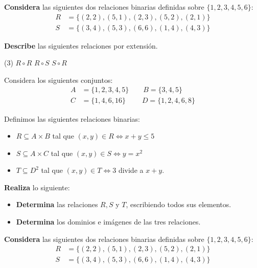 \documentclass[oneside]{style}
\begin{document}
\begin{questions}[label=\protect\circled{\bfseries\arabic*}]
    \newpage
    \question
    {
        \textbf{Considera} las siguientes dos relaciones binarias definidas 
        sobre $\{1,2,3,4,5,6\}$:
        \begin{align*}
            R &= \{(2,2), (5,1), (2,3), (5,2), (2,1)\} \\ 
            S &= \{(3,4), (5,3), (6,6), (1,4), (4,3)\}
        \end{align*}

        \textbf{Describe} las siguientes relaciones por extensión. 
        \begin{tasks}(3)
            \task $R \circ R$
            \task $R \circ S$
            \task $S \circ R$
        \end{tasks}
    }

    \question
    {
        Considera los siguientes conjuntos:
        \begin{align*}
            A &= \{1,2,3,4,5\} \quad \quad B = \{3,4,5\} \\ 
            C &= \{1,4,6,16\} \quad \quad \; D = \{1,2,4,6,8\}
        \end{align*}

        Definimos las siguientes relaciones binarias:
        \begin{itemize}
            \item $R \subseteq A \times B$ tal que $(x,y) \in R 
            \Leftrightarrow x+y \leq 5$

            \item $S \subseteq A \times C$ tal que $(x,y) \in S 
            \Leftrightarrow y = x^2$

            \item $T \subseteq D^2$ tal que $(x,y) \in T \Leftrightarrow
            3$ divide a $x+y$. 
        \end{itemize}

        \textbf{Realiza} lo siguiente:
        \begin{itemize}
            \item \textbf{Determina} las relaciones $R,S$ y $T$, escribiendo 
            todos sus elementos. 

            \item \textbf{Determina} los dominios e imágenes de las tres 
            relaciones. 
        \end{itemize}
    }

    \question
    {
        \textbf{Considera} las siguientes dos relaciones binarias definidas 
        sobre $\{1,2,3,4,5,6\}$:
        \begin{align*}
            R &= \{(2,2), (5,1), (2,3), (5,2), (2,1)\} \\ 
            S &= \{(3,4), (5,3), (6,6), (1,4), (4,3)\}
        \end{align*}

}
\end{questions}
\end{document}
